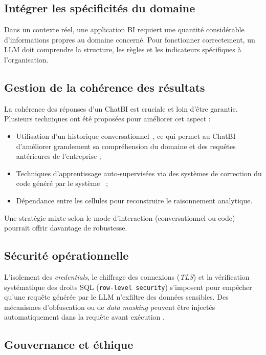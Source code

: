 \documentclass[conference]{IEEEtran}
\begin{document}
\subsection{Intégrer les spécificités du domaine}

Dans un contexte réel, une application BI requiert une quantité considérable d’informations propres au domaine concerné. Pour fonctionner correctement, un LLM doit comprendre la structure, les règles et les indicateurs spécifiques à l’organisation.

\subsection{Gestion de la cohérence des résultats}

La cohérence des réponses d’un ChatBI est cruciale et loin d’être garantie. Plusieurs techniques ont été proposées pour améliorer cet aspect :
\begin{itemize}
    \item Utilisation d’un historique conversationnel~\citep{jiang2024siriusbi}, ce qui permet au ChatBI d’améliorer grandement sa compréhension du domaine et des requêtes antérieures de l’entreprise ;
    \item Techniques d’apprentissage auto-supervisées via des systèmes de correction du code généré par le système~\citep{busany2024autobir} ;
    \item Dépendance entre les cellules pour reconstruire le raisonnement analytique.
\end{itemize}

Une stratégie mixte selon le mode d’interaction (conversationnel ou code) pourrait offrir davantage de robustesse.


\subsection{Sécurité opérationnelle}

L’isolement des \textit{credentials}, le chiffrage des connexions (\textit{TLS}) et la vérification systématique des droits SQL (\texttt{row-level security}) s’imposent pour empêcher qu’une requête générée par le LLM n’exfiltre des données sensibles.  Des mécanismes d’obfuscation ou de \textit{data masking} peuvent être injectés automatiquement dans la requête avant exécution \citep{busany2024autobir}.

\subsection{Gouvernance et éthique}
\end{document}
